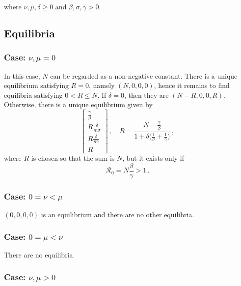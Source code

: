 \documentclass[fleqn]{article}
\begin{document}
where $\nu,\mu,\delta \geq 0$ and $\beta,\sigma,\gamma > 0$.

\subsection{Equilibria}

\subsubsection{Case: $\nu, \mu = 0$}

In this case, $N$ can be regarded as a non-negative constant.
There is a unique equilibrium satisfying $R = 0$,
namely $(N, 0, 0, 0)$,
hence it remains to find equilibria satisfying $0 < R \leq N$.
If $\delta = 0$, then they are $(N - R, 0, 0, R)$.
Otherwise, there is a unique equilibrium given by
\begin{equation}
\begin{bmatrix}
  \frac{\gamma}{\beta} \\
  R \frac{\delta}{m \sigma} \\
  R \frac{\delta}{n \gamma} \\
  R
\end{bmatrix}
\,,\quad
R = \frac{N - \frac{\gamma}{\beta}}{1 + \delta \big(\frac{1}{\sigma} + \frac{1}{\gamma}\big)}\,,
\end{equation}
where $R$ is chosen so that the sum is $N$, but it exists only if
\begin{equation}
\mathcal{R}_{0} = N \frac{\beta}{\gamma} > 1\,.
\end{equation}

\subsubsection{Case: $0 = \nu < \mu$}

$(0, 0, 0, 0)$ is an equilibrium and there are no other equilibria.

\subsubsection{Case: $0 = \mu < \nu$}

There are no equilibria.

\subsubsection{Case: $\nu, \mu > 0$}
\end{document}
